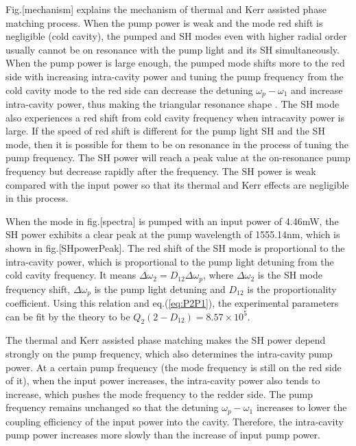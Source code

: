 \documentclass[a4paper,12pt,hyperref]{article}
\begin{document}
Fig.[mechanism] explains the mechanism of thermal and Kerr assisted phase matching process. When the pump power is weak and the mode red shift is negligible (cold cavity), the pumped and SH modes even with higher radial order usually cannot be on resonance with the pump light and its SH simultaneously. When the pump power is large enough, the pumped mode shifts more to the red side with increasing intra-cavity power and tuning the pump frequency from the cold cavity mode to the red side can decrease the detuning $\omega_p-\omega_1$ and increase intra-cavity power, thus making the triangular resonance shape \cite{carmon2004dynamical}. The SH mode also experiences a red shift from cold cavity frequency when intracavity power is large. If the speed of red shift is different for the pump light SH and the SH mode, then it is possible for them to be on resonance in the process of tuning the pump frequency. The SH power will reach a peak value at the on-resonance pump frequency but decrease rapidly after the frequency. The SH power is weak compared with the input power so that its thermal and Kerr effects are negligible in this process.

When the mode in fig.[spectra] is pumped with an input power of 4.46mW, the SH power exhibits a clear peak at the pump wavelength of 1555.14nm, which is shown in fig.[SHpowerPeak]. The red shift of the SH mode is proportional to the intra-cavity power, which is proportional to the pump light detuning from the cold cavity frequency. It means $\Delta \omega_2 = D_{12}\Delta \omega_p$, where $\Delta \omega_2$ is the SH mode frequency shift, $\Delta \omega_p$ is the pump light detuning and $D_{12}$ is the proportionality coefficient.  Using this relation and eq.(\ref{eq:P2P1}), the experimental parameters can be fit by the theory to be $Q_2(2-D_{12})=8.57\times 10^5$.

The thermal and Kerr assisted phase matching makes the SH power depend strongly on the pump frequency, which also determines the intra-cavity pump power. At a certain pump frequency (the mode frequency is still on the red side of it), when the input power increases, the intra-cavity power also tends to increase, which pushes the mode frequency to the redder side. The pump frequency remains unchanged so that the detuning $\omega_p-\omega_1$ increases to lower the coupling efficiency of the input power into the cavity. Therefore, the intra-cavity pump power increases more slowly than the increase of input pump power. 
\end{document}
